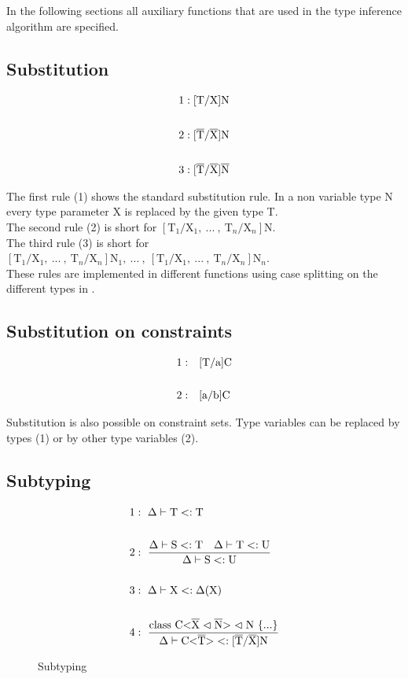 In the following sections all auxiliary functions that are used in the type inference algorithm are specified.

\subsection{Substitution}

\begin{align*}
1&: \text{[T/X]N}
\\
\\
2&: \text{[}\overline{\text{T}}/\overline{\text{X}}\text{]N}
\\
\\
3&: \text{[}\overline{\text{T}}/\overline{\text{X}}\text{]}\overline{\text{N}}
\end{align*}

The first rule (1) shows the standard substitution rule. In a non variable type N every type parameter X is replaced by the given type T.
\\
The second rule (2) is short for $[\text{T}_1/\text{X}_1, \ ... \ , \ \text{T}_n/\text{X}_n]\text{N}$.
\\
The third rule (3) is short for $[\text{T}_1/\text{X}_1, \ ... \ , \ \text{T}_n/\text{X}_n]\text{N}_1, \ ... \ , \ [\text{T}_1/\text{X}_1, \ ... \ , \ \text{T}_n/\text{X}_n]\text{N}_n$.
\\
These rules are implemented in different functions using case splitting on the different types in .

\subsection{Substitution on constraints}

\begin{align*}
    1:& \quad \text{[T/a]C}\\
    \\
    2:& \quad \text{[a/b]C}
\end{align*}

Substitution is also possible on constraint sets. Type variables can be replaced by types (1) or by other type variables (2).

\subsection{Subtyping}

\begin{figure}[tp]
    \begin{align*}
1&: \ \Delta \vdash \text{T} <: \text{T}
\\
\\
2&: \ \frac{\Delta \vdash \text{S} <: \text{T} \quad \Delta \vdash \text{T} <: \text{U}}{\Delta \vdash \text{S} <: \text{U}}
\\
\\
3&: \ \Delta \vdash \text{X} <: \Delta(\text{X})
\\
\\
4&: \ \frac{\text{class C<} \overline{\text{X}} \vartriangleleft \overline{\text{N}} \text{>} \vartriangleleft \text{N} \ \{...\}}{\Delta \vdash \text{C<}\overline{\text{T}}\text{>} <: \text{[}\overline{\text{T}}/\overline{\text{X}}\text{]N}}
    \end{align*}
    \caption{Subtyping}
    \label{subtyping}
\end{figure}

